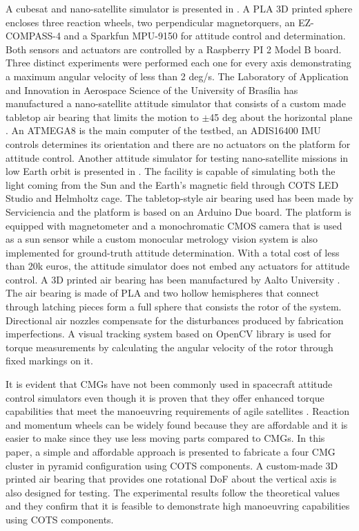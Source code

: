 \documentclass[aerospace,article,submit,moreauthors,dvi2pdf]{Definitions/mdpi}
\begin{document}
A cubesat and nano-satellite simulator is presented in \cite{44}. A PLA 3D printed sphere encloses three reaction wheels, two perpendicular magnetorquers, an EZ-COMPASS-4 and a Sparkfun MPU-9150 for attitude control and determination.
Both sensors and actuators are controlled by a Raspberry PI 2 Model B board. Three distinct experiments were performed each one for every axis demonstrating a maximum angular velocity of less than 2 deg/s. 
 The Laboratory of Application and Innovation in Aerospace Science of the University of Brasília has manufactured a nano-satellite attitude simulator that consists of a custom made tabletop air bearing that limits the motion to $\pm$45 deg about the horizontal plane \cite{29}. An ATMEGA8 is the main computer of the testbed, an ADIS16400 IMU controls determines its orientation and there are no actuators on the platform for attitude control.
Another attitude simulator for testing nano-satellite missions in low Earth orbit is presented in \cite{37}. The facility is capable of simulating both the light coming from the Sun and the Earth's magnetic field through COTS LED Studio and Helmholtz cage. The tabletop-style air bearing used has been made by Serviciencia and the platform is based on an Arduino Due board. The platform is equipped with magnetometer and a monochromatic CMOS camera that is used as a sun sensor while a custom monocular metrology vision system is also implemented for ground-truth attitude determination. With a total cost of less than 20k euros, the attitude simulator does not embed any actuators for attitude control.
A 3D printed air bearing has been manufactured by Aalto University \cite{34}. The air bearing is made of PLA and two hollow hemispheres that connect through latching pieces form a full sphere that consists the rotor of the system. Directional air nozzles compensate for the disturbances produced by fabrication imperfections. A visual tracking system based on OpenCV library is used for torque measurements by calculating the angular velocity of the rotor through fixed markings on it.

It is evident that CMGs have not been commonly used in spacecraft attitude control simulators even though it is proven that they offer enhanced torque capabilities that meet the manoeuvring requirements of agile satellites \cite{SMCS, lappasthesis}. Reaction and momentum wheels can be widely found because they are affordable and it is easier to make since they use less moving parts compared to CMGs. In this paper, a simple and affordable approach is presented to fabricate a four CMG cluster in pyramid configuration using COTS components. A custom-made 3D printed air bearing that provides one rotational DoF about the vertical axis is also designed for testing. The experimental results follow the theoretical values and they confirm that it is feasible to demonstrate high manoeuvring capabilities using COTS components. 
 
\end{document}
